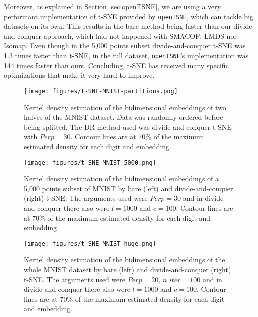 Moreover, as explained in Section \ref{sec:openTSNE}, we are using a very performant implementation of t-SNE provided by \verb|openTSNE|, which can tackle big datasets on its own. This results in the bare method being faster than our divide-and-conquer approach, which had not happened with SMACOF, LMDS nor Isomap. Even though in the 5,000 points subset divide-and-conquer t-SNE was 1.3 times faster than t-SNE, in the full dataset, \verb|openTSNE|'s implementation was 144 times faster than ours. Concluding, t-SNE has received many specific optimizations that make it very hard to improve.

\begin{figure}
    \centering
    \texttt{[image: figures/t-SNE-MNIST-partitions.png]}
    \caption{Kernel density estimation of the bidimensional embeddings of two halves of the MNIST dataset. Data was randomly ordered before being splitted. The DR method used was divide-and-conquer t-SNE with $Perp=30$. Contour lines are at 70\% of the maximum estimated density for each digit and embedding.}
    \label{fig:t-SNE-MNIST-partitions}
\end{figure}

\begin{figure}
    \centering
    \texttt{[image: figures/t-SNE-MNIST-5000.png]}
    \caption{Kernel density estimation of the bidimensional embeddings of a 5,000 points subset of MNIST by bare (left) and divide-and-conquer (right) t-SNE. The arguments used were $Perp=30$ and in divide-and-conquer there also were $l=1000$ and $c=100$. Contour lines are at 70\% of the maximum estimated density for each digit and embedding.}
    \label{fig:t-SNE-MNIST}
\end{figure}

\begin{figure}
    \centering
    \texttt{[image: figures/t-SNE-MNIST-huge.png]}
    \caption{Kernel density estimation of the bidimensional embeddings of the whole MNIST dataset by bare (left) and divide-and-conquer (right) t-SNE. The arguments used were $Perp=20, \, n\_iter=100$ and in divide-and-conquer there also were $l=1000$ and $c=100$. Contour lines are at 70\% of the maximum estimated density for each digit and embedding.}
    \label{fig:t-SNE-MNIST-huge}
\end{figure}
